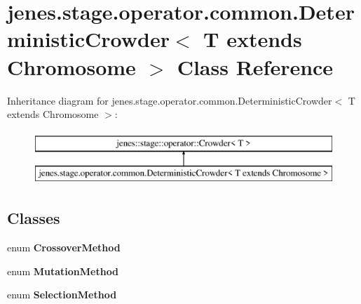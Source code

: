 \hypertarget{classjenes_1_1stage_1_1operator_1_1common_1_1_deterministic_crowder_3_01_t_01extends_01_chromosome_01_4}{\section{jenes.\-stage.\-operator.\-common.\-Deterministic\-Crowder$<$ T extends Chromosome $>$ Class Reference}
\label{classjenes_1_1stage_1_1operator_1_1common_1_1_deterministic_crowder_3_01_t_01extends_01_chromosome_01_4}
}
Inheritance diagram for jenes.\-stage.\-operator.\-common.\-Deterministic\-Crowder$<$ T extends Chromosome $>$\-:\begin{figure}[H]
\begin{center}
\leavevmode
\includegraphics[height=2.000000cm]{classjenes_1_1stage_1_1operator_1_1common_1_1_deterministic_crowder_3_01_t_01extends_01_chromosome_01_4}
\end{center}
\end{figure}
\subsection*{Classes}
\begin{DoxyCompactItemize}
\item 
enum {\bfseries Crossover\-Method}
\item 
enum {\bfseries Mutation\-Method}
\item 
enum {\bfseries Selection\-Method}
\end{DoxyCompactItemize}
